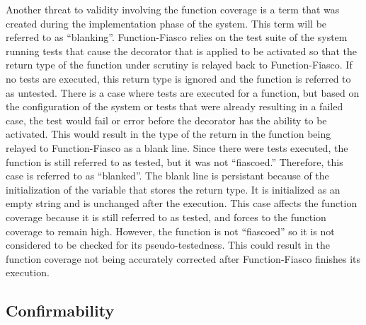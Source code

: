 Another threat to validity involving the function coverage is a term that was created during the implementation phase of the system. This term will be referred to as ``blanking''.  Function-Fiasco relies on the test suite of the system running tests that cause the decorator that is applied to be activated so that the return type of the function under scrutiny is relayed back to Function-Fiasco. If no tests are executed, this return type is ignored and the function is referred to as untested. There is a case where tests are executed for a function, but based on the configuration of the system or tests that were already resulting in a failed case, the test would fail or error before the decorator has the ability to be activated. This would result in the type of the return in the function being relayed to Function-Fiasco as a blank line. Since there were tests executed, the function is still referred to as tested, but it was not ``fiascoed.'' Therefore, this case is referred to as ``blanked''. The blank line is persistant because of the initialization of the variable that stores the return type. It is initialized as an empty string and is unchanged after the execution. This case affects the function coverage because it is still referred to as tested, and forces to the function coverage to remain high. However, the function is not ``fiascoed'' so it is not considered to be checked for its pseudo-testedness. This could result in the function coverage not being accurately corrected after Function-Fiasco finishes its execution.


\subsection{Confirmability}


